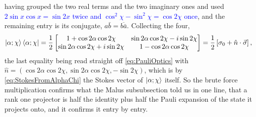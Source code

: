             having grouped the two real terms and the two imaginary ones and used \textcolor{blue}{$2\sin x\cos x=\sin2x$ twice and $\cos^2\chi-\sin^2\chi=\cos2\chi$ once}, and the remaining entry is its conjugate, $a\bar{b}=\overline{b\bar{a}}$. Collecting the four,
            \begin{equation}\label{eq:ProjectorFromKet}
                \ket{\alpha;\chi}\bra{\alpha;\chi} = \frac{1}{2}\begin{bmatrix}
                    1+\cos2\alpha\cos2\chi & \sin2\alpha\cos2\chi-i\sin2\chi \\
                    \sin2\alpha\cos2\chi+i\sin2\chi & 1-\cos2\alpha\cos2\chi
                \end{bmatrix} = \frac{1}{2}\left[\sigma_0+\hat{n}\cdot\vec{\sigma}\right],
            \end{equation}
            the last equality being read straight off \ref{eq:PauliOptics} with $\hat{n}=\left(\cos2\alpha\cos2\chi,\sin2\alpha\cos2\chi,-\sin2\chi\right)$, which is by \ref{eq:StokesFromAlphaChi} the Stokes vector of $\ket{\alpha;\chi}$ itself. So the brute force multiplication confirms what the Malus subsubsection told us in one line, that a rank one projector is half the identity plus half the Pauli expansion of the state it projects onto, and it confirms it entry by entry.

